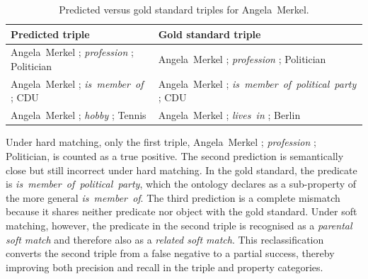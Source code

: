 \documentclass[a4paper,oneside,bibliography=totoc]{scrbook}
\begin{document}
\begin{table}[ht]
  \centering
  \label{tab:merkel_triples}
  \begin{tabular}{p{}p{}}
    \toprule
    \textbf{Predicted triple} & \textbf{Gold standard triple}                               \\ \midrule
    Angela~Merkel ; \textit{profession} ; Politician
                              & Angela~Merkel ; \textit{profession} ; Politician            \\[0.2em]
    Angela~Merkel ; \textit{is~member~of} ; CDU
                              & Angela~Merkel ; \textit{is~member~of~political~party} ; CDU \\[0.2em]
    Angela~Merkel ; \textit{hobby} ; Tennis
                              & Angela~Merkel ; \textit{lives~in} ; Berlin                  \\
    \bottomrule
  \end{tabular}
  \caption{Predicted versus gold standard triples for Angela~Merkel.}
\end{table}

Under hard matching, only the first triple, Angela~Merkel ; \textit{profession} ; Politician, is counted as a true positive. The second prediction is semantically close but still incorrect under hard matching. In the gold standard, the predicate is \textit{is~member~of~political~party}, which the ontology declares as a sub-property of the more general \textit{is~member~of}. The third prediction is a complete mismatch because it shares neither predicate nor object with the gold standard. Under soft matching, however, the predicate in the second triple is recognised as a \emph{parental soft match} and therefore also as a \emph{related soft match}. This reclassification converts the second triple from a false negative to a partial success, thereby improving both precision and recall in the triple and property categories.
\end{document}
